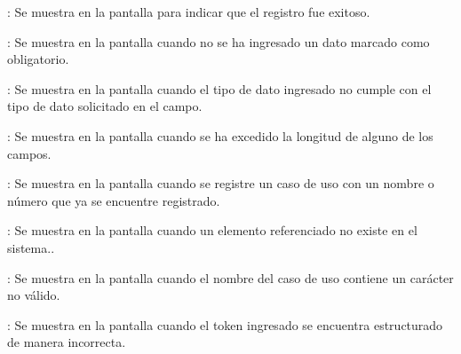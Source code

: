 \begin{Citemize}
	\item {}: Se muestra en la pantalla  para indicar que el registro fue exitoso.
	\item {}: Se muestra en la pantalla  cuando no se ha ingresado un dato marcado como obligatorio.
	\item {}: Se muestra en la pantalla  cuando el tipo de dato ingresado no cumple con el tipo de dato solicitado en el campo.
	\item {}: Se muestra en la pantalla  cuando se ha excedido la longitud de alguno de los campos.
	\item {}: Se muestra en la pantalla  cuando se registre un caso de uso con un nombre o número que ya se encuentre registrado.
	\item {}: Se muestra en la pantalla  cuando un elemento referenciado no existe en el sistema..
	\item {}: Se muestra en la pantalla  cuando el nombre del caso de uso contiene un carácter no válido.
	\item {}: Se muestra en la pantalla  cuando el token ingresado se encuentra estructurado de manera incorrecta.
\end{Citemize}
